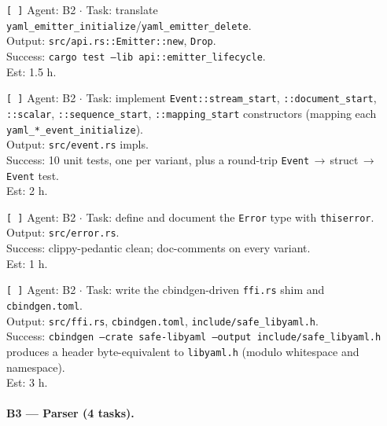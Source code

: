 \documentclass[12pt]{article}
\theoremstyle{definition}
\theoremstyle{remark}
\begin{document}
\begin{flushleft}
\texttt{[\,]} Agent: B2 \(\cdot\) Task: translate
\texttt{yaml\_emitter\_initialize}/\texttt{yaml\_emitter\_delete}.
\\
\quad Output: \texttt{src/api.rs::Emitter::new}, \texttt{Drop}.
\\
\quad Success: \texttt{cargo test --lib api::emitter\_lifecycle}.
\\
\quad Est: 1.5 h.
\end{flushleft}

\begin{flushleft}
\texttt{[\,]} Agent: B2 \(\cdot\) Task: implement
\texttt{Event::stream\_start}, \texttt{::document\_start},
\texttt{::scalar}, \texttt{::sequence\_start}, \texttt{::mapping\_start}
constructors (mapping each \texttt{yaml\_*\_event\_initialize}).
\\
\quad Output: \texttt{src/event.rs} impls.
\\
\quad Success: 10 unit tests, one per variant, plus a round-trip
\texttt{Event}\,$\to$\,struct\,$\to$\,\texttt{Event} test.
\\
\quad Est: 2 h.
\end{flushleft}

\begin{flushleft}
\texttt{[\,]} Agent: B2 \(\cdot\) Task: define and document the
\texttt{Error} type with \texttt{thiserror}.
\\
\quad Output: \texttt{src/error.rs}.
\\
\quad Success: clippy-pedantic clean; doc-comments on every variant.
\\
\quad Est: 1 h.
\end{flushleft}

\begin{flushleft}
\texttt{[\,]} Agent: B2 \(\cdot\) Task: write the cbindgen-driven
\texttt{ffi.rs} shim and \texttt{cbindgen.toml}.
\\
\quad Output: \texttt{src/ffi.rs}, \texttt{cbindgen.toml},
\texttt{include/safe\_libyaml.h}.
\\
\quad Success: \texttt{cbindgen --crate safe-libyaml --output
include/safe\_libyaml.h} produces a header byte-equivalent to
\texttt{libyaml.h} (modulo whitespace and namespace).
\\
\quad Est: 3 h.
\end{flushleft}

\paragraph{B3 --- Parser (4 tasks).}
\end{document}
